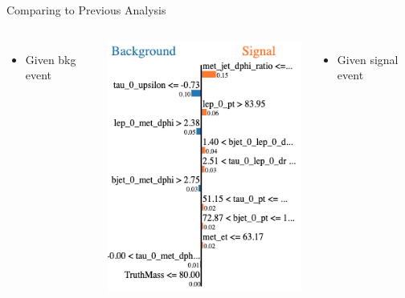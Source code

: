 \documentclass[aspectratio=169,xcolor=table]{beamer}
\begin{document}
    \begin{frame}{Comparing to Previous Analysis}
      \begin{columns}[t]
        \begin{itemize}
          \item Given bkg event
        \end{itemize}
        \includegraphics[width=.9\linewidth,keepaspectratio=true]{PawelModel_HPlus80_BKG.png}
        \begin{itemize}
          \item Given signal event
        \end{itemize}

\end{columns}
\end{frame}
\end{document}
